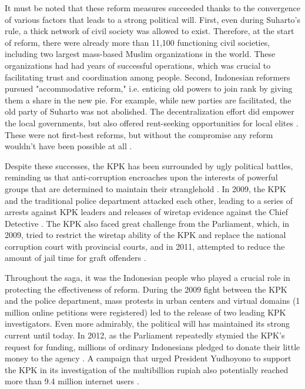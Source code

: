 \documentclass[12pt]{article}
\begin{document}
It must be noted that these reform measures succeeded thanks to the convergence of various factors that leads to a strong political will. First, even during Suharto's rule, a thick network of civil society was allowed to exist. Therefore, at the start of reform, there were already more than 11,100 functioning civil societies, including two largest mass-based Muslim organizations in the world. These organizations had had years of successful operations, which was crucial to facilitating trust and coordination among people. Second, Indonesian reformers pursued "accommodative reform," i.e. enticing old powers to join rank by giving them a share in the new pie. For example, while new parties are facilitated, the old party of Suharto was not abolished. The decentralization effort did empower the local governments, but also offered rent-seeking opportunities for local elites \citep{Hadiz2004}. These were not first-best reforms, but without the compromise any reform wouldn't have been possible at all \citep{Harris2011}.

Despite these successes, the KPK has been surrounded by ugly political battles, reminding us that anti-corruption encroaches upon the interests of powerful groups that are determined to maintain their stranglehold \citep{Kimura2011}. In 2009, the KPK and the traditional police department attacked each other, leading to a series of arrests against KPK leaders and releases of wiretap evidence against the Chief Detective \citep{Luebke2012}. The KPK also faced great challenge from the Parliament, which, in 2009, tried to restrict the wiretap ability of the KPK and replace the national corruption court with provincial courts, and in 2011, attempted to reduce the amount of jail time for graft offenders \citep{TransparencyInternational2011}.

Throughout the saga, it was the Indonesian people who played a crucial role in protecting the effectiveness of reform. During the 2009 fight between the KPK and the police department, mass protests in urban centers and virtual domains (1 million online petitions were registered) led to the release of two leading KPK investigators. Even more admirably, the political will has maintained its strong current until today. In 2012, as the Parliament repeatedly stymied the KPK's request for funding, millions of ordinary Indonesians pledged to donate their little money to the agency \citep{Jaaffar2012}. A campaign that urged President Yudhoyono to support the KPK in its investigation of the multibillion rupiah also potentially reached more than 9.4 million internet users \citep{Mahditama2012}.
\end{document}
